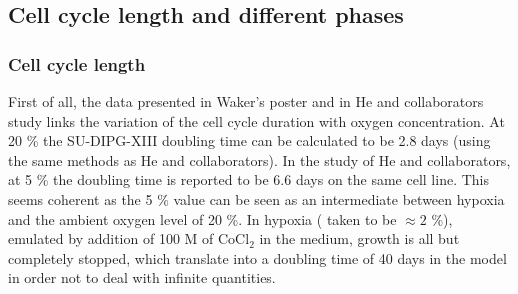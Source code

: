 \documentclass[11pt,a4paper]{article}
\begin{document}
\subsection{Cell cycle length and different phases}
\subsubsection{Cell cycle length}
First of all, the data presented in Waker's poster and in He and collaborators study links the variation of the cell cycle duration with oxygen concentration. At 20 \% the SU-DIPG-XIII doubling time can be calculated to be 2.8 days (using the same methods as He and collaborators). In the study of He and collaborators, at 5 \% the doubling time is reported to be 6.6 days on the same cell line.\cite{He2021} This seems coherent as the 5 \% value can be seen as an intermediate between hypoxia and the ambient oxygen level of 20 \%. In hypoxia ( taken to be $\approx 2$ \%), emulated by addition of 100 \textmu M of CoCl$_2$ in the medium, growth is all but completely stopped, which translate into a doubling time of 40 days in the model in order not to deal with infinite quantities.\cite{Waker2018}
\end{document}
